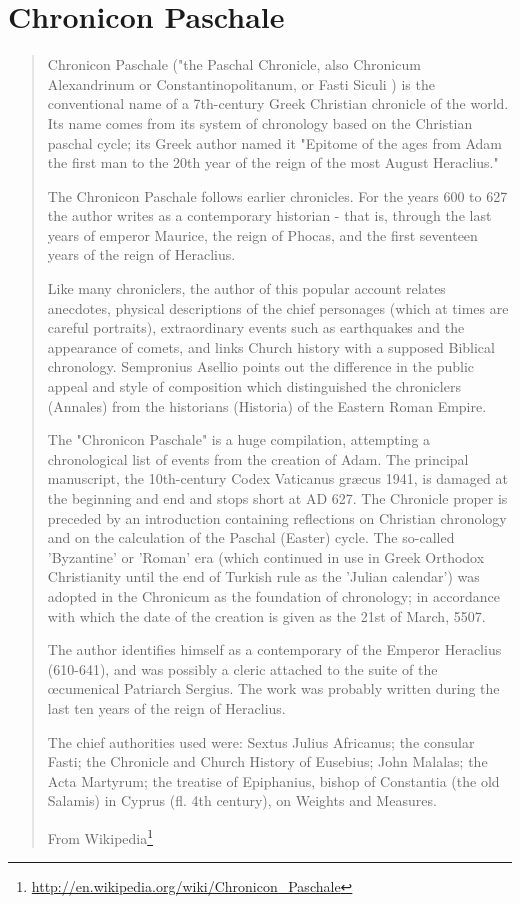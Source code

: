 \documentclass[12pt,letterpaper,twoside,final]{memoir}
\begin{document}
\section{Chronicon Paschale}
\blockquote[From Wikipedia\footnote{\url{http://en.wikipedia.org/wiki/Chronicon_Paschale}}]{Chronicon Paschale ("the Paschal Chronicle, also Chronicum Alexandrinum or Constantinopolitanum, or Fasti Siculi ) is the conventional name of a 7th-century Greek Christian chronicle of the world. Its name comes from its system of chronology based on the Christian paschal cycle; its Greek author named it "Epitome of the ages from Adam the first man to the 20th year of the reign of the most August Heraclius."

The Chronicon Paschale follows earlier chronicles. For the years 600 to 627 the author writes as a contemporary historian - that is, through the last years of emperor Maurice, the reign of Phocas, and the first seventeen years of the reign of Heraclius.

Like many chroniclers, the author of this popular account relates anecdotes, physical descriptions of the chief personages (which at times are careful portraits), extraordinary events such as earthquakes and the appearance of comets, and links Church history with a supposed Biblical chronology. Sempronius Asellio points out the difference in the public appeal and style of composition which distinguished the chroniclers (Annales) from the historians (Historia) of the Eastern Roman Empire.

The "Chronicon Paschale" is a huge compilation, attempting a chronological list of events from the creation of Adam. The principal manuscript, the 10th-century Codex Vaticanus græcus 1941, is damaged at the beginning and end and stops short at AD 627. The Chronicle proper is preceded by an introduction containing reflections on Christian chronology and on the calculation of the Paschal (Easter) cycle. The so-called 'Byzantine' or 'Roman' era (which continued in use in Greek Orthodox Christianity until the end of Turkish rule as the 'Julian calendar') was adopted in the Chronicum as the foundation of chronology; in accordance with which the date of the creation is given as the 21st of March, 5507.

The author identifies himself as a contemporary of the Emperor Heraclius (610-641), and was possibly a cleric attached to the suite of the œcumenical Patriarch Sergius. The work was probably written during the last ten years of the reign of Heraclius.

The chief authorities used were: Sextus Julius Africanus; the consular Fasti; the Chronicle and Church History of Eusebius; John Malalas; the Acta Martyrum; the treatise of Epiphanius, bishop of Constantia (the old Salamis) in Cyprus (fl. 4th century), on Weights and Measures.}
\end{document}
